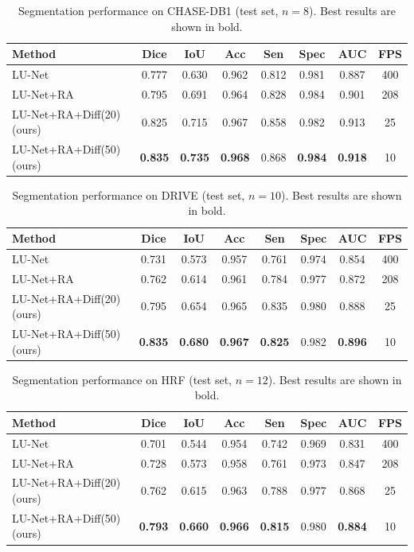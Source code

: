 \documentclass[journal,article,submit,pdftex,moreauthors]{Definitions/mdpi}
\begin{document}
\begin{table}[H]
\centering
\caption{Segmentation performance on CHASE-DB1 (test set, $n=8$). Best results are shown in bold.}
\label{tab:chase_results}
\begin{tabular}{lccccccc}
\toprule
Method & Dice & IoU & Acc & Sen & Spec & AUC & FPS \\
\midrule
LU-Net~\cite{Hernandez2025} & 0.777 & 0.630 & 0.962 & 0.812 & 0.981 & 0.887 & 400 \\
LU-Net+RA~\cite{Hernandez2025} & 0.795 & 0.691 & 0.964 & 0.828 & 0.984 & 0.901 & 208 \\
LU-Net+RA+Diff(20) (ours) & 0.825 & 0.715 & 0.967 & 0.858 & 0.982 & 0.913 & 25 \\
LU-Net+RA+Diff(50) (ours) & \textbf{0.835} & \textbf{0.735} & \textbf{0.968} & 0.868 & \textbf{0.984} & \textbf{0.918} & 10 \\
\bottomrule
\end{tabular}
\end{table}
\begin{table}[H]
\centering
\caption{Segmentation performance on DRIVE (test set, $n=10$). Best results are shown in bold.}
\begin{tabular}{lccccccc}
\toprule
Method & Dice & IoU & Acc & Sen & Spec & AUC & FPS \\
\midrule
LU-Net~\cite{Hernandez2025} & 0.731 & 0.573 & 0.957 & 0.761 & 0.974 & 0.854 & 400 \\
LU-Net+RA~\cite{Hernandez2025} & 0.762 & 0.614 & 0.961 & 0.784 & 0.977 & 0.872 & 208 \\
LU-Net+RA+Diff(20) (ours) & 0.795 & 0.654 & 0.965 & 0.835 & 0.980 & 0.888 & 25 \\
LU-Net+RA+Diff(50) (ours) & \textbf{0.835} & \textbf{0.680} & \textbf{0.967} & \textbf{0.825} & 0.982 & \textbf{0.896} & 10 \\
\bottomrule
\end{tabular}
\label{tab:drive_results}
\end{table}

\begin{table}[H]
\centering
\caption{Segmentation performance on HRF (test set, $n=12$). Best results are shown in bold.}
\begin{tabular}{lccccccc}
\toprule
Method & Dice & IoU & Acc & Sen & Spec & AUC & FPS \\
\midrule
LU-Net~\cite{Hernandez2025} & 0.701 & 0.544 & 0.954 & 0.742 & 0.969 & 0.831 & 400 \\
LU-Net+RA~\cite{Hernandez2025} & 0.728 & 0.573 & 0.958 & 0.761 & 0.973 & 0.847 & 208 \\
LU-Net+RA+Diff(20) (ours) & 0.762 & 0.615 & 0.963 & 0.788 & 0.977 & 0.868 & 25 \\
LU-Net+RA+Diff(50) (ours) & \textbf{0.793} & \textbf{0.660} & \textbf{0.966} & \textbf{0.815} & 0.980 & \textbf{0.884} & 10 \\
\bottomrule
\end{tabular}
\label{tab:hrf_results}
\end{table}
\end{document}

